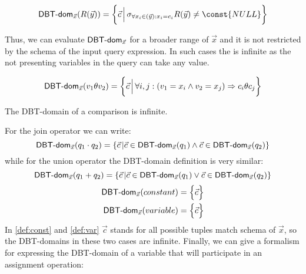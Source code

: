 \documentclass[12pt]{article}
\begin{document}
\begin{equation}
\label{def:relation}
\dom{}_{\vec x}(R(\vec y))=\bigg\{\vec c\,\Big|\,\sigma_{\forall x_i\in(\vec{y}): x_{i}=c_{i}}R(\vec y)\not= \const{NULL}\bigg\}
\end{equation}

Thus, we can evaluate $\text{\textsf{DBT-dom}}_{\vec{x}}$ for a broader range of $\vec{x}$ and it is not restricted by the schema of the input query expression. In such cases the \dom{} is infinite as the not presenting variables in the query can take any value.

\begin{equation}
\text{\textsf{DBT-dom}{}}_{\vec{x}}(v_{1}\theta v_{2})=\bigg\{\vec{c}\,\Big|\,\forall i,j:(v_{1}=x_{i}\land v_{2}=x_{j})\Rightarrow c_{i}\theta c_{j}\bigg\}
\end{equation}

The DBT-domain of a comparison is infinite.

For the join operator we can write:
\begin{equation}
\label{def:join}
\text{\textsf{DBT-dom}{}}_{\vec{x}}(q_{1}\cdot q_{2})=\{\vec{c}\,|\vec{c}\in\text{\textsf{DBT-dom}{}}_{\vec{x}}(q_{1})\land\vec{c}\in\text{\textsf{DBT-dom}{}}_{\vec{x}}(q_{2})\}
\end{equation}
while for the union operator the DBT-domain definition is very similar:
\begin{equation}
\label{def:plus}
\text{\textsf{DBT-dom}{}}_{\vec{x}}(q_{1}+ q_{2})=\{\vec{c}\,|\vec{c}\in\text{\textsf{DBT-dom}{}}_{\vec{x}}(q_{1})\lor\vec{c}\in\text{\textsf{DBT-dom}{}}_{\vec{x}}(q_{2})\}
\end{equation}
\begin{eqnarray}
\textsf{DBT-dom}{}_{\vec x}(constant)=\Big\{\vec c\Big\}\label{def:const}\\
\textsf{DBT-dom}{}_{\vec x}(variable)=\Big\{\vec c\Big\}\label{def:var}
\end{eqnarray}
In \eqref{def:const} and \eqref{def:var}  $\vec{c}$ stands for all possible tuples match schema of $\vec{x}$, so the DBT-domains in these two cases are infinite. 
Finally, we can give a formalism for expressing the DBT-domain of a variable that will participate in an assignment operation:
\end{document}
